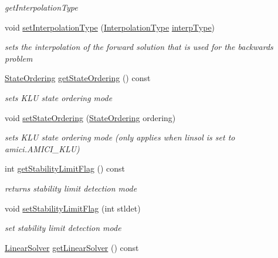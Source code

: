 \begin{DoxyCompactItemize}
\begin{DoxyCompactList}\small\item\em get\+Interpolation\+Type \end{DoxyCompactList}\item 
void \mbox{\hyperlink{classamici_1_1_solver_a9d9a0a5f8cdfdb993960706c646e240f}{set\+Interpolation\+Type}} (\mbox{\hyperlink{namespaceamici_a8472f01c511d77bbfb981a46618ea1ea}{Interpolation\+Type}} \mbox{\hyperlink{classamici_1_1_solver_a5a80193af5ca74a4a4e3da67a7e74a98}{interp\+Type}})
\begin{DoxyCompactList}\small\item\em sets the interpolation of the forward solution that is used for the backwards problem \end{DoxyCompactList}\item 
\mbox{\hyperlink{namespaceamici_a890d968060d6d830aeed98dbeb04447f}{State\+Ordering}} \mbox{\hyperlink{classamici_1_1_solver_ac758cf7c51f50db18ea58898623ce12c}{get\+State\+Ordering}} () const
\begin{DoxyCompactList}\small\item\em sets K\+LU state ordering mode \end{DoxyCompactList}\item 
void \mbox{\hyperlink{classamici_1_1_solver_aa22ae4579c350a6f3fae2e3b5a0da1de}{set\+State\+Ordering}} (\mbox{\hyperlink{namespaceamici_a890d968060d6d830aeed98dbeb04447f}{State\+Ordering}} ordering)
\begin{DoxyCompactList}\small\item\em sets K\+LU state ordering mode (only applies when linsol is set to amici.\+A\+M\+I\+C\+I\+\_\+\+K\+LU) \end{DoxyCompactList}\item 
int \mbox{\hyperlink{classamici_1_1_solver_ae1e9c3c5e59413ae25fb67c29983e3f3}{get\+Stability\+Limit\+Flag}} () const
\begin{DoxyCompactList}\small\item\em returns stability limit detection mode \end{DoxyCompactList}\item 
void \mbox{\hyperlink{classamici_1_1_solver_afdf072c35ae67261f8106e8bf6b4a44a}{set\+Stability\+Limit\+Flag}} (int stldet)
\begin{DoxyCompactList}\small\item\em set stability limit detection mode \end{DoxyCompactList}\item 
\mbox{\hyperlink{namespaceamici_a1a6a4776314a0843143e5631c3ce21a7}{Linear\+Solver}} \mbox{\hyperlink{classamici_1_1_solver_aa5cde2d316aae1d60d6eaf94ce7a854f}{get\+Linear\+Solver}} () const

\end{DoxyCompactItemize}
